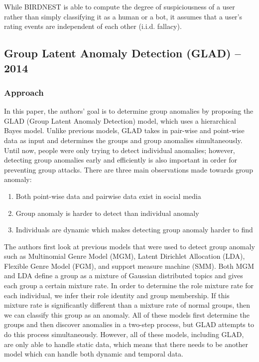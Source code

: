 \documentclass[11pt, oneside]{article}   	%
\begin{document}
\quad While BIRDNEST is able to compute the degree of suspiciousness of a user rather than simply classifying it as a human or a bot, it assumes that a user's rating events are independent of each other (i.i.d. fallacy).

\subsection*{Group Latent Anomaly Detection (GLAD) -- 2014}

\subsubsection*{Approach}

\quad In this paper, the authors' goal is to determine group anomalies by proposing the GLAD (Group Latent Anomaly Detection) model, which uses a hierarchical Bayes model.
Unlike previous models, GLAD takes in pair-wise and point-wise data as input and determines the groups and group anomalies simultaneously.
Until now, people were only trying to detect individual anomalies; however, detecting group anomalies early and efficiently is also important in order for preventing group attacks.
There are three main observations made towards group anomaly:
\begin{enumerate}
	\item Both point-wise data and pairwise data exist in social media
	\item Group anomaly is harder to detect than individual anomaly
	\item Individuals are dynamic which makes detecting group anomaly harder to find
\end{enumerate}

\quad The authors first look at previous models that were used to detect group anomaly such as Multinomial Genre Model (MGM), Latent Dirichlet Allocation (LDA), Flexible Genre Model (FGM), and support measure machine (SMM).
Both MGM and LDA define a group as a mixture of Gaussian distributed topics and gives each group a certain mixture rate.
In order to determine the role mixture rate for each individual, we infer their role identity and group membership.
If this mixture rate is significantly different than a mixture rate of normal groups, then we can classify this group as an anomaly.
All of these models first determine the groups and then discover anomalies in a two-step process, but GLAD attempts to do this process simultaneously.
However, all of these models, including GLAD, are only able to handle static data, which means that there needs to be another model which can handle both dynamic and temporal data.
\end{document}
